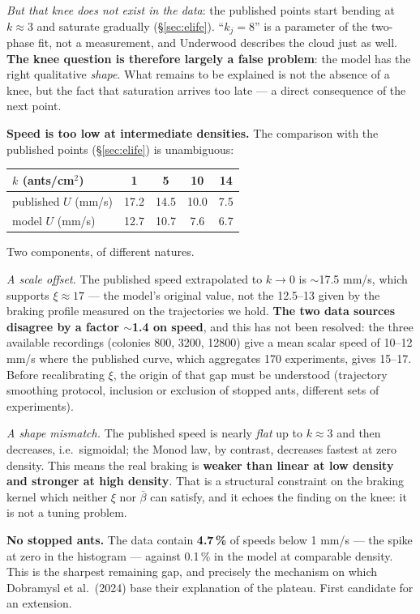 \documentclass[11pt,a4paper]{article}
\begin{document}
\emph{But that knee does not exist in the data}: the published points start
bending at $k\approx3$ and saturate gradually (\S\ref{sec:elife}). ``$k_j=8$''
is a parameter of the two-phase fit, not a measurement, and Underwood describes
the cloud just as well. \textbf{The knee question is therefore largely a false
problem}: the model has the right qualitative \emph{shape}. What remains to be
explained is not the absence of a knee, but the fact that saturation arrives too
late --- a direct consequence of the next point.

\textbf{Speed is too low at intermediate densities.} The comparison with the
published points (\S\ref{sec:elife}) is unambiguous:

\begin{center}
\begin{tabular}{@{}lcccc@{}}
\toprule
$k$ (ants/cm$^2$) & 1 & 5 & 10 & 14 \\
\midrule
published $U$ (mm/s) & 17.2 & 14.5 & 10.0 & 7.5 \\
model $U$ (mm/s) & 12.7 & 10.7 & 7.6 & 6.7 \\
\bottomrule
\end{tabular}
\end{center}

Two components, of different natures.

\emph{A scale offset.} The published speed extrapolated to $k\to0$ is
$\sim$17.5 mm/s, which supports $\xi\approx17$ --- the model's original value,
not the 12.5--13 given by the braking profile measured on the trajectories we
hold. \textbf{The two data sources disagree by a factor $\sim$1.4 on speed}, and
this has not been resolved: the three available recordings (colonies 800, 3200,
12800) give a mean scalar speed of 10--12 mm/s where the published curve, which
aggregates 170 experiments, gives 15--17. Before recalibrating $\xi$, the origin
of that gap must be understood (trajectory smoothing protocol, inclusion or
exclusion of stopped ants, different sets of experiments).

\emph{A shape mismatch.} The published speed is nearly \emph{flat} up to
$k\approx3$ and then decreases, i.e.\ sigmoidal; the Monod law, by contrast,
decreases fastest at zero density. This means the real braking is
\textbf{weaker than linear at low density and stronger at high density}. That is
a structural constraint on the braking kernel which neither $\xi$ nor
$\bar\beta$ can satisfy, and it echoes the finding on the knee: it is not a
tuning problem.

\textbf{No stopped ants.} The data contain \textbf{4.7\,\%} of speeds below
1 mm/s --- the spike at zero in the histogram --- against 0.1\,\% in the model at
comparable density. This is the sharpest remaining gap, and precisely the
mechanism on which Dobramysl et al.\ (2024) base their explanation of the
plateau. First candidate for an extension.
\end{document}
